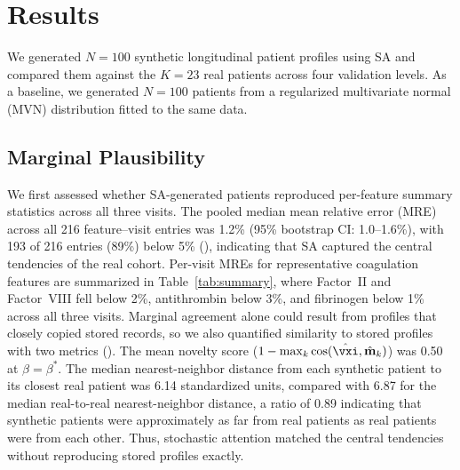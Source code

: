 \section{Results}
\label{sec:results}

We generated $N{=}100$ synthetic longitudinal patient profiles using SA and compared
them against the $K{=}23$ real patients across four validation levels. As a baseline, we generated
$N{=}100$ patients from a regularized multivariate normal (MVN) distribution fitted
to the same data.

\subsection{Marginal Plausibility}
\label{sec:results-l1}

We first assessed whether SA-generated patients reproduced per-feature summary
statistics across all three visits. The pooled median mean relative error
(MRE) across all 216 feature--visit entries was 1.2\% (95\% bootstrap CI:
1.0--1.6\%), with 193 of 216 entries (89\%) below 5\%
(), indicating that SA captured the central
tendencies of the real cohort. Per-visit MREs for representative
coagulation features are summarized in Table~\ref{tab:summary}, where
Factor~II and Factor~VIII fell below 2\%, antithrombin below 3\%, and
fibrinogen below 1\% across all three visits. Marginal agreement alone could result from
profiles that closely copied stored records, so we also quantified similarity to stored
profiles with two metrics (). The mean novelty score
($1 - \max_k \cos(\hat{\vxi}, \hat{\mathbf{m}}_k)$) was 0.50 at
$\beta = \beta^*$. The median
nearest-neighbor distance from each synthetic patient to its closest real
patient was 6.14 standardized units, compared with 6.87 for the median
real-to-real nearest-neighbor distance, a ratio of 0.89 indicating that
synthetic patients were approximately as far from real patients as real
patients were from each other. Thus, stochastic attention matched the central tendencies
without reproducing stored profiles exactly.

